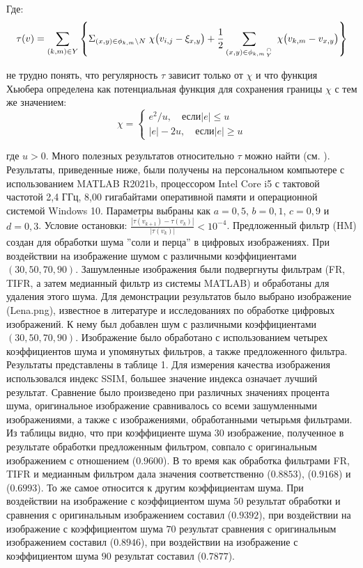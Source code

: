 \noindent Где:
\begin{equation*}
    \tau(v)=\sum_{(k,m)\in Y}\left\{\Sigma_{(x,y)\in\phi_{k,m}\backslash{N}}\;\chi\bigl(v_{i,j}-\xi_{x,y}\bigr)+\frac{1}{2}\sum_{(x,y)\in\phi_{k,m}\stackover{\cap}{Y}}\;\chi\bigl(v_{k,m}-v_{x,y}\bigr)\right\}
\end{equation*}

\noindent не трудно понять, что регулярность $\tau$ зависит только от $\chi$ и
что функция Хьюбера определена как потенциальная функция для сохранения границы
$\chi$ с тем же значением:
\begin{equation*}
    \chi = \begin{cases} 
        e^{2}/u, \quad \text{если} |e|\leq u \\ 
        |e|-2u, \quad \text{если} |e| \ge u
    \end{cases}
\end{equation*}

\noindent где $u > 0$. Много полезных результатов относительно $\tau$ можно
найти (см. \cite{art24,art25,art26}). Результаты, приведенные ниже, были
получены на персональном компьютере с использованием MATLAB R2021b, процессором
Intel Core i5 с тактовой частотой 2,4 ГГц, 8,00 гигабайтами оперативной памяти и
операционной системой Windows 10. Параметры выбраны как $a = 0,5$, $b = 0,1$, $c
= 0,9$ и $d = 0,3$. Условие остановки:
${\frac{|\tau(v_{k+1})-\tau(v_{k})|}{|\tau(v_{k})|}}<10^{-4}$. Предложенный
фильтр (HM) создан для обработки шума ''соли и перца'' в цифровых изображениях. При
воздействии на изображение шумом с различными коэффициентами
$\left(30,50,70,90\right)$. Зашумленные изображения были подвергнуты фильтрам
(FR, TIFR, а затем медианный фильтр из системы MATLAB) и обработаны для удаления
этого шума. Для демонстрации результатов было выбрано изображение (Lena.png),
известное в литературе и исследованиях по обработке цифровых изображений. К нему
был добавлен шум с различными коэффициентами $\left(30,50,70,90\right)$.
Изображение было обработано с использованием четырех коэффициентов шума и
упомянутых фильтров, а также предложенного фильтра. Результаты представлены в
таблице 1. Для измерения качества изображения использовался индекс SSIM, большее
значение индекса означает лучший результат. Сравнение было произведено при
различных значениях процента шума, оригинальное изображение сравнивалось со
всеми зашумленными изображениями, а также с изображениями, обработанными
четырьмя фильтрами. Из таблицы видно, что при коэффициенте шума $30$
изображение, полученное в результате обработки предложенным фильтром, совпало с
оригинальным изображением с отношением ($0.9600$). В то время как обработка фильтрами FR,
TIFR и медианным фильтром дала значения соответственно ($0.8853$), ($0.9168$) и
($0.6993$). То же самое относится к другим коэффициентам шума. При воздействии на
изображение с коэффициентом шума $50$ результат обработки и сравнения с
оригинальным изображением составил ($0.9392$), при воздействии на изображение с
коэффициентом шума $70$ результат сравнения с оригинальным изображением составил
($0.8946$), при воздействии на изображение с коэффициентом шума $90$ результат
составил ($0.7877$).

